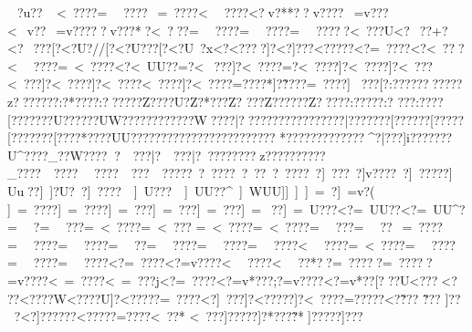 {{{{{{{{{{{{{{{{{{{{{{{{{{{{{{{{{{{{{{{{{{{{{{{{{{{{{{{{{{{{{{{{{{{{{{{{{{{{{{{{{{{{{{{{{{{{{{{{{{{{{{{{{{{{{{{{{{{{{{{{{{{{{{{{{{{{{{{{{{{{{{{{{{{{{{{{{{{{{{{{{{{{{{{{{{{{{{{{{{{{{{{{{{{{{{{{{{{{{{{{{{{{{{{{{{{{{{{{{{{{{{{{{{{{{{{{{{{{{{{{{{{{{{{{{{{{{{{{{{{{{{{{{{{{{{{{{{{{{{{{{{{{{{{{{{{{{{{{{{{{{{{{{{{{{{{{{{{{{{{{{{{{{{{{{{{{{{{{{{{{{{{{{{{{{{{{{{{{{{{{{{{{{{{{{{{{{{{{{{{{{{{{{{{{{{{{{{{{{{{{{{{{{{{{{{{{{{{{{{{{{{{{{{{{{{{{{{{{{{{{{{{{{{{{{{{{{{{{{{{{{{{{{{{{{{{{{{{{{{{{{{{{{{{{{{{{{{{{{{{{{{{{{{{{{{{{{{{{{{{{{{{{{{{{{{{{{{{{{{{{{{{{{{{{{{{{{{{{{{{{{{{{{{{{{{{{{{{{{{{{{{{{{{{{{{{{{{{{{{{{{{{{{{{{{{{{{{{{{{{{{{{{{{{{{{{{{{{{{{{{{{{{{{{{{{{{{{{{{{{{{{{{{{{{{{{{{{{{{{{{{{{{{{{{{{{{{{{{{{{{{{{{{{{{{{{{{{{{{{{{{{{{{{{{{{{{{{{{{{{{{{{{{{{{{{{{{{{{{{{{{{{{{{{{{{{{{{{{{{{{{{{{{{{{{{{{{{{{{{{{{{{{{{{{{{{{{{{{{{{{{{{{{{{{{{{{{{{{{{{{{{{{{{{{{{{{{{{{{{{{{{{{{{{{{{{{{{{{{{{{{{{{{{{{{{{{{{{{{{{{{{{{{{{{{{{{{{{{{{{{{{{{{{{{{{{{{{{{{{{{{{{{{{{{{{{{{{{{{{{{{{{{{{{{{{{{{{{{{{{{{{{{{{{{{{{{{{{{{{{{{{{{{{{{{{{{{{{{{{{{{{{~?u??  ~<~????=~~????~=~????<~~????<?v?**??v????~=v???<~v??~=v?????v???*?<~???=~~????=~~????=~~?????<~???U<?~??+?<?~??? [?<?U?//[?<?U???[?<?U~?x<?<????]?<?]???\?<?????<?=~????<?<~???<~~????=~<~????<?<~UU??=?<~???]?<~????=?<~????]?<~????]?<~???\?<~???]?<~????]?<~????\?<~????]?<~????\?=????*]?\~????\?=~????\?]~
???[?:?????{??????z??????{?:?*???{?:??????Z????U{?Z? *??{?Z? 
??{?Z?????{?Z????{?:? ???{?:? 
??{?:?  ??{?[?  ????{??U????{??UW???{?????????W????|????}???? {?????????|???????[?????{?[?????[?{?????{?[????*??{??UU??{???????{???????{???????{?
*?????????????^?|???]i???????U^?}???_??W??}??}?~~??? |?~~??? |?~???????}?z? ??}??????}?_???}?~~??? }?~~???}?~~???~~}?????~?}~????~?}~??~?}~????~?]~???~?]v????~?]~????}?]~Uu?}?]~]?U?~?]~????~~]~U???~~]~UU??^~]~WUU]]~]~    ]~=~?   ]~=v?(  ]~=~????]~=~????]~=~???]~=~???]~=~???]~=~??]~=~U???<?=~UU??<?=~UU^?=~~  ? =~~??? =~<~????=~<~???
=~<~????=~<~????=~~???=~~??~=~????=~~????=~~????=~~??=~~????=~~????=~~????<~~????=~<~????=~~????=~~????=~~????<?=~????<?=v????<~~????<~~??*??=~?????=~?????=v????<~=~????<~=~???j<?=~????<?=v*???;?=v????<?=v *??[?\???U\?<???\?<? ??\?<????W<?\????U]?<?????\?=~????<?]~?? ?]?<?????]?<~????=?\?????<?\~??? \?\~???
]?\???<?]?????}?<?????\?=???? \?<~??*
\?<~??? \?]?????\?]?*???\?\~?* \?]?????\?]???
}}}}}}}}}}}}}}}}}}}}}}}}}}}}}}}}}}}}}}}}}}}}}}}}}}}}}}}}}}}}}}}}}}}}}}}}}}}}}}}}}}}}}}}}}}}}}}}}}}}}}}}}}}}}}}}}}}}}}}}}}}}}}}}}}}}}}}}}}}}}}}}}}}}}}}}}}}}}}}}}}}}}}}}}}}}}}}}}}}}}}}}}}}}}}}}}}}}}}}}}}}}}}}}}}}}}}}}}}}}}}}}}}}}}}}}}}}}}}}}}}}}}}}}}}}}}}}}}}}}}}}}}}}}}}}}}}}}}}}}}}}}}}}}}}}}}}}}}}}}}}}}}}}}}}}}}}}}}}}}}}}}}}}}}}}}}}}}}}}}}}}}}}}}}}}}}}}}}}}}}}}}}}}}}}}}}}}}}}}}}}}}}}}}}}}}}}}}}}}}}}}}}}}}}}}}}}}}}}}}}}}}}}}}}}}}}}}}}}}}}}}}}}}}}}}}}}}}}}}}}}}}}}}}}}}}}}}}}}}}}}}}}}}}}}}}}}}}}}}}}}}}}}}}}}}}}}}}}}}}}}}}}}}}}}}}}}}}}}}}}}}}}}}}}}}}}}}}}}}}}}}}}}}}}}}}}}}}}}}}}}}}}}}}}}}}}}}}}}}}}}}}}}}}}}}}}}}}}}}}}}}}}}}}}}}}}}}}}}}}}}}}}}}}}}}}}}}}}}}}}}}}}}}}}}}}}}}}}}}}}}}}}}}}}}}}}}}}}}}}}}}}}}}}}}}}}}}}}}}}}}}}}}}}}}}}}}}}}}}}}}}}}}}}}}}}}}}}}}}}}}}}}}}}}}}}}}}}}}}}}}}}}}}}}}}}}}}}}}}}}}}}}}}}}}}}}}}}}}}}}}}}}}}}}}}}}}}}}}}}}}}}}}}}}}}}}}}}}}}}}}}}}}}}}}}}}}}}}}}}}}}}}}}}}}}}}}}}}}}}}}}}}}}}}}}}}}}}}}}}}}}}}}}}}}}}}}}}}}}}}}}}}}}}}}}}}}}}}}}}}}}}}}}}}}}}}}}}}}}}}}}}}}}}}}}}}}}}}}}}}}}}}}}}}}}}}}}}}}}}}}}}}}}}}}
